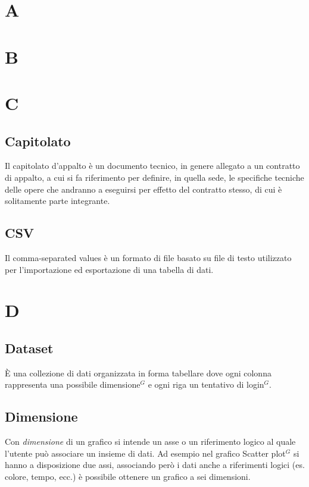\section{A}

\newpage
\section{B}

\newpage
\section{C}
\subsection{Capitolato}
Il capitolato d'appalto è un documento tecnico, in genere allegato a un contratto di appalto, a cui si fa riferimento per definire, in quella sede, le specifiche tecniche delle opere che andranno a eseguirsi per effetto del contratto stesso, di cui è solitamente parte integrante.

\subsection{CSV}
Il comma-separated values è un formato di file basato su file di testo utilizzato per l'importazione ed esportazione di una tabella di dati.

\newpage
\section{D}
\subsection{Dataset}
\`E una collezione di dati organizzata in forma tabellare dove ogni colonna rappresenta una possibile dimensione$^{G}$ e ogni riga un tentativo di login$^{G}$.

\subsection{Dimensione}
Con \textit{dimensione} di un grafico si intende un asse o un riferimento logico al quale l'utente può associare un insieme di dati. Ad esempio nel grafico Scatter plot$^{G}$ si hanno a disposizione due assi, associando però i dati anche a riferimenti logici (es. colore, tempo, ecc.) è possibile ottenere un grafico a sei dimensioni. 


